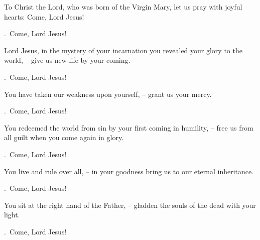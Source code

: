 \lettrine[loversize=0.15,lines=2]{T}{}o Christ the Lord, who was born of the Virgin Mary, let us pray with joyful hearts: Come, Lord Jesus!
\par \Rbar.~Come, Lord Jesus!

Lord Jesus, in the mystery of your incarnation you revealed your glory to the world,
– give us new life by your coming.
\par \Rbar.~Come, Lord Jesus!

You have taken our weakness upon yourself,
– grant us your mercy.
\par \Rbar.~Come, Lord Jesus!

You redeemed the world from sin by your first coming in humility,
– free us from all guilt when you come again in glory.
\par \Rbar.~Come, Lord Jesus!

You live and rule over all,
– in your goodness bring us to our eternal inheritance.
\par \Rbar.~Come, Lord Jesus!

You sit at the right hand of the Father,
– gladden the souls of the dead with your light.
\par \Rbar.~Come, Lord Jesus!
